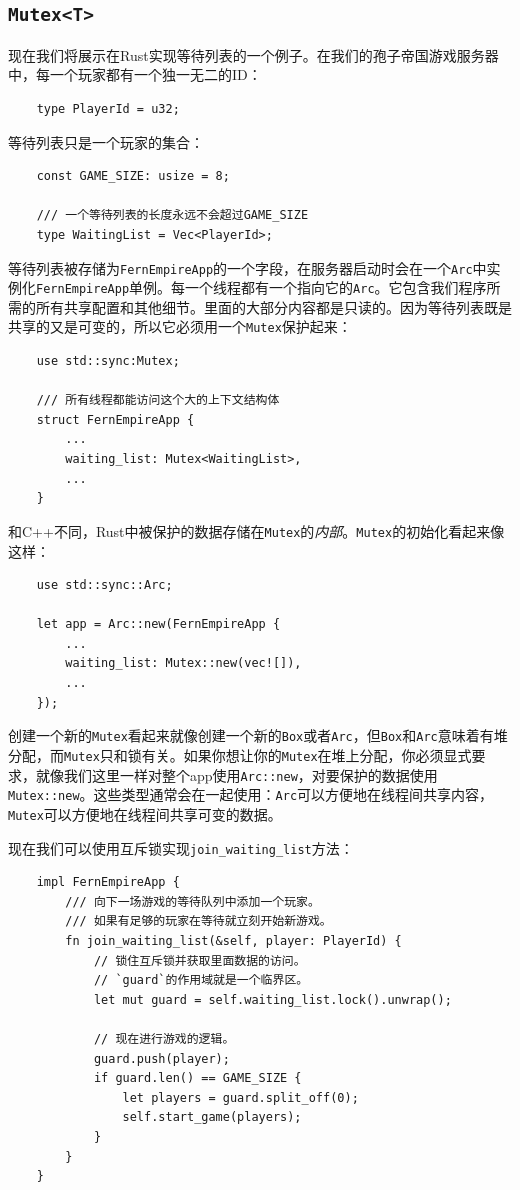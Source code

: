 \subsection{\texttt{Mutex<T>}}\label{mutex}
现在我们将展示在Rust实现等待列表的一个例子。在我们的孢子帝国游戏服务器中，每一个玩家都有一个独一无二的ID：
\begin{verbatim}
    type PlayerId = u32;
\end{verbatim}

等待列表只是一个玩家的集合：
\begin{verbatim}
    const GAME_SIZE: usize = 8;
    
    /// 一个等待列表的长度永远不会超过GAME_SIZE
    type WaitingList = Vec<PlayerId>;
\end{verbatim}

等待列表被存储为\texttt{FernEmpireApp}的一个字段，在服务器启动时会在一个\texttt{Arc}中实例化\texttt{FernEmpireApp}单例。每一个线程都有一个指向它的\texttt{Arc}。它包含我们程序所需的所有共享配置和其他细节。里面的大部分内容都是只读的。因为等待列表既是共享的又是可变的，所以它必须用一个\texttt{Mutex}保护起来：
\begin{verbatim}
    use std::sync:Mutex;

    /// 所有线程都能访问这个大的上下文结构体
    struct FernEmpireApp {
        ...
        waiting_list: Mutex<WaitingList>,
        ...
    }
\end{verbatim}

和C++不同，Rust中被保护的数据存储在\texttt{Mutex}的\emph{内部}。\texttt{Mutex}的初始化看起来像这样：
\begin{verbatim}
    use std::sync::Arc;

    let app = Arc::new(FernEmpireApp {
        ...
        waiting_list: Mutex::new(vec![]),
        ...
    });
\end{verbatim}

创建一个新的\texttt{Mutex}看起来就像创建一个新的\texttt{Box}或者\texttt{Arc}，但\texttt{Box}和\texttt{Arc}意味着有堆分配，而\texttt{Mutex}只和锁有关。如果你想让你的\texttt{Mutex}在堆上分配，你必须显式要求，就像我们这里一样对整个app使用\texttt{Arc::new}，对要保护的数据使用\texttt{Mutex::new}。这些类型通常会在一起使用：\texttt{Arc}可以方便地在线程间共享内容，\texttt{Mutex}可以方便地在线程间共享可变的数据。

现在我们可以使用互斥锁实现\texttt{join\_waiting\_list}方法：
\begin{verbatim}
    impl FernEmpireApp {
        /// 向下一场游戏的等待队列中添加一个玩家。
        /// 如果有足够的玩家在等待就立刻开始新游戏。
        fn join_waiting_list(&self, player: PlayerId) {
            // 锁住互斥锁并获取里面数据的访问。
            // `guard`的作用域就是一个临界区。
            let mut guard = self.waiting_list.lock().unwrap();

            // 现在进行游戏的逻辑。
            guard.push(player);
            if guard.len() == GAME_SIZE {
                let players = guard.split_off(0);
                self.start_game(players);
            }
        }
    }
\end{verbatim}

